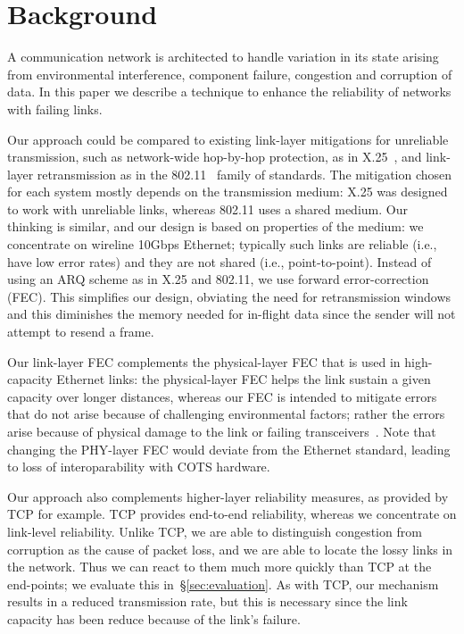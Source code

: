 \section{Background}
A communication network is architected to handle variation in its state
arising from environmental interference, component failure, congestion and
corruption of data. In this paper we describe a technique to enhance the
reliability of networks with failing links.

Our approach could be compared to existing link-layer mitigations for
unreliable transmission, such as network-wide hop-by-hop protection, as in
X.25~\cite{X25}, and link-layer retransmission as in the 802.11~\cite{WiFi} family of
standards. The mitigation chosen for each system mostly depends on
the transmission medium: X.25 was designed to work with unreliable links,
whereas 802.11 uses a shared medium. Our thinking is similar,
and our design is based on properties of the medium: we concentrate on wireline
10Gbps Ethernet; typically such links are reliable (i.e., have low error
rates) and they are not shared (i.e., point-to-point).
Instead of using an ARQ scheme as in X.25 and 802.11, we use forward
error-correction (FEC).
This simplifies our design, obviating the need for retransmission windows and this
diminishes the memory needed for in-flight data since the sender will
not attempt to resend a frame.

Our link-layer FEC complements the physical-layer FEC that is used in
high-capacity Ethernet links: the physical-layer FEC helps the link sustain a
given capacity over longer distances, whereas our FEC is intended to mitigate
errors that do not arise because of challenging environmental factors; rather
the errors arise because of physical damage to the link or failing
transceivers~\cite{Zhuo:2017:UMP:3098822.3098849}.
Note that changing the PHY-layer FEC would deviate from the Ethernet standard,
leading to loss of interoparability with COTS hardware.

Our approach also complements higher-layer reliability measures, as provided by
TCP for example.  TCP provides end-to-end reliability, whereas we concentrate
on link-level reliability. Unlike TCP, we are able to distinguish congestion
from corruption as the cause of packet loss, and we are able to locate the
lossy links in the network. Thus we can react to them much more quickly than
TCP at the end-points; we evaluate this in~\S\ref{sec:evaluation}. As with TCP, our mechanism results in a reduced
transmission rate, but this is necessary since the link capacity has been
reduce because of the link's failure.

